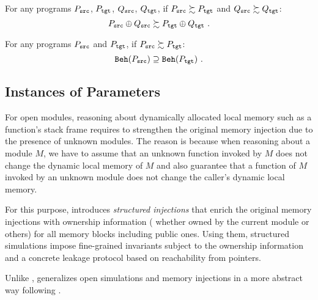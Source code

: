 \begin{theorem}[HorComp]
  For any programs $P_{\texttt{src}}$, $P_{\texttt{tgt}}$, $Q_{\texttt{src}}$, $Q_{\texttt{tgt}}$, if $P_{\texttt{src}} \succsim P_{\texttt{tgt}}$ and
  $Q_{\texttt{src}} \succsim Q_{\texttt{tgt}}$:
  \[
  \vspace{-0.8mm}
  P_\src \llink Q_\src \succsim P_\tgt \llink Q_\tgt~.
  \vspace{-0.8mm}
  \]
\end{theorem}
\begin{theorem}[Adequacy]
  For any programs $P_{\texttt{src}}$ and $P_{\texttt{tgt}}$, if $P_{\texttt{src}} \succsim P_{\texttt{tgt}}$:
  \[
  \vspace{-0.8mm}
  \beh{P_\src} \supseteq \beh{P_\tgt}~.
  \vspace{-0.8mm}
  \]
\end{theorem}



\subsection{Instances of Parameters}

\label{sec:overview-verification:injection:dynamic}
%
For open modules, reasoning about dynamically allocated local memory
such as a function's stack frame requires to strengthen the original
memory injection due to the presence of unknown modules.  The reason
is because when reasoning about a module $M$, we have to assume that
an unknown function invoked by $M$ does not change the dynamic local
memory of $M$ and also guarantee that a function of $M$ invoked by an
unknown module does not change the caller's dynamic local memory.

For this purpose, \ccc{} introduces \emph{structured injections} that
enrich the original memory injections with ownership information (\ie
whether owned by the current module or others) for all memory blocks
including public ones.  Using them, structured simulations impose
fine-grained invariants subject to the ownership information and a
concrete leakage protocol based on reachability from pointers.

Unlike \ccc{}, \ccm{} generalizes open simulations and memory injections
in a more abstract way following \cite{DBLP:conf/icfp/DreyerNB10,pb}.

